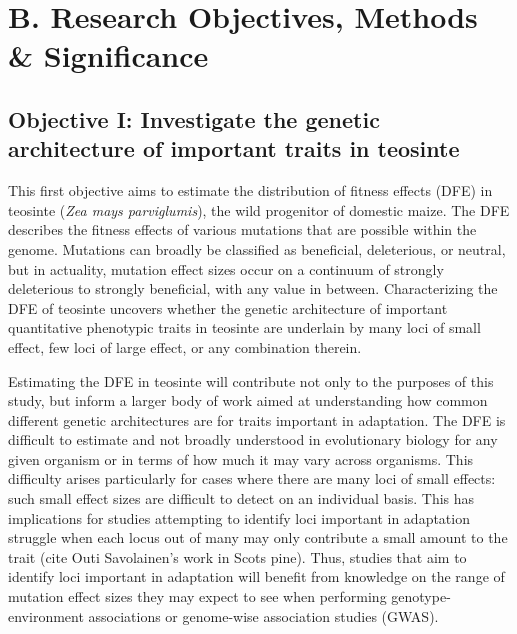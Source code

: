 	




\section*{B. Research Objectives, Methods \& Significance}
\subsection*{Objective I: Investigate the genetic architecture of important traits in teosinte}
This first objective aims to estimate the distribution of fitness effects (DFE) in teosinte (\emph{Zea mays parviglumis}), the wild progenitor of domestic maize. The DFE describes the fitness effects of various mutations that are possible within the genome. Mutations can broadly be classified as beneficial, deleterious, or neutral, but in actuality, mutation effect sizes occur on a continuum of strongly deleterious to strongly beneficial, with any value in between. Characterizing the DFE of teosinte uncovers whether the genetic architecture of important quantitative phenotypic traits in teosinte are underlain by many loci of small effect, few loci of large effect, or any combination therein.

Estimating the DFE in teosinte will contribute not only to the purposes of this study, but inform a larger body of work aimed at understanding how common different genetic architectures are for traits important in adaptation. The DFE is difficult to estimate and not broadly understood in evolutionary biology for any given organism or in terms of how much it may vary across organisms. This difficulty arises particularly for cases where there are many loci of small effects: such small effect sizes are difficult to detect on an individual basis. This has implications for studies attempting to identify loci important in adaptation struggle when each locus out of many may only contribute a small amount to the trait (cite Outi Savolainen's work in Scots pine). Thus, studies that aim to identify loci important in adaptation will benefit from knowledge on the range of mutation effect sizes they may expect to see when performing genotype-environment associations or genome-wise association studies (GWAS). 

